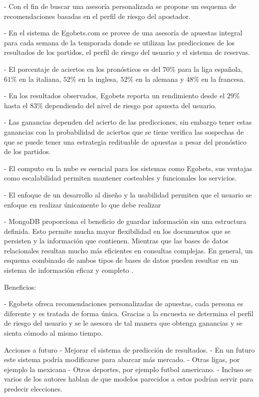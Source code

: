 - Con el fin de buscar una asesoría personalizada se propone un esquema de recomendaciones basadas en el perfil de riesgo del apostador.

- En el sistema de Egobets.com se provee de una asesoría de apuestas integral para cada semana de la temporada donde se utilizan las predicciones de los resultados de los partidos, el perfil de riesgo del usuario y el sistema de reservas.


- El porcentaje de aciertos en los pronósticos es del $70\%$ para la liga española, $61\%$ en la italiana, $52\%$ en la inglesa, $52\%$ en la alemana y $48\%$ en la francesa.


- En los resultados observados, Egobets reporta un rendimiento desde el $29\%$ hasta el $83\%$ dependiendo del nivel de riesgo por apuesta del usuario.

- Las ganancias dependen del acierto de las predicciones, sin embargo tener estas ganancias con la probabilidad de aciertos que se tiene verifica las sospechas de que se puede tener una estrategia redituable de apuestas a pesar del pronóstico de los partidos.

- El computo en la nube es esencial para los sistemas como Egobets, sus ventajas como escalabilidad permiten mantener costeables y funcionales los servicios.

- El enfoque de un desarrollo al diseño y la usabilidad permiten que el usuario se enfoque en realizar únicamente lo que debe realizar 

- MongoDB proporciona el beneficio de guardar información sin una estructura definida. Esto permite mucha mayor flexibilidad en los documentos que se persisten y la información que contienen\cite{puniaimplementing}. Mientras que las bases de datos relacionales resultan mucho más eficientes en consultas complejas. En general, un esquema combinado de ambos tipos de bases de datos pueden resultar en un sistema de información eficaz y completo \cite{faraj2014comparative}.


Beneficios:

- Egobets ofreca recomendaciones personalizadas de apuestas, cada persona es diferente y es tratada de forma única. Gracias a la encuesta se determina el perfil de riesgo del usuario y se le asesora de tal manera que obtenga ganancias y se sienta cómodo  al mismo tiempo.


Acciones a futuro
- Mejorar el sistema de predicción de resultados.
- En un futuro este sistema podría modificarse para abarcar más mercado.
	- Otras ligas, por ejemplo la mexicana
	- Otros deportes, por ejemplo futbol americano.
- Incluso se varios de los autores hablan de que modelos parecidos a estos podrían servir para predecir elecciones.


